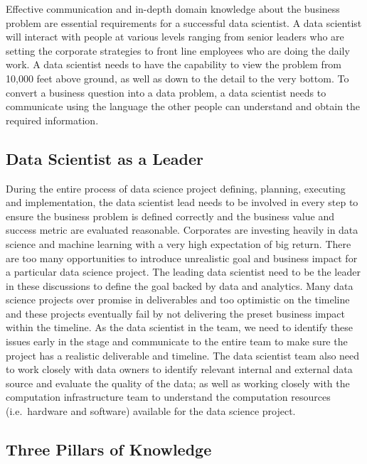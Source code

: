 \documentclass[
]{article}
\begin{document}
Effective communication and in-depth domain knowledge about the business
problem are essential requirements for a successful data scientist. A
data scientist will interact with people at various levels ranging from
senior leaders who are setting the corporate strategies to front line
employees who are doing the daily work. A data scientist needs to have
the capability to view the problem from 10,000 feet above ground, as
well as down to the detail to the very bottom. To convert a business
question into a data problem, a data scientist needs to communicate
using the language the other people can understand and obtain the
required information.

\hypertarget{data-scientist-as-a-leader}{%
\subsection{Data Scientist as a
Leader}\label{data-scientist-as-a-leader}}

During the entire process of data science project defining, planning,
executing and implementation, the data scientist lead needs to be
involved in every step to ensure the business problem is defined
correctly and the business value and success metric are evaluated
reasonable. Corporates are investing heavily in data science and machine
learning with a very high expectation of big return. There are too many
opportunities to introduce unrealistic goal and business impact for a
particular data science project. The leading data scientist need to be
the leader in these discussions to define the goal backed by data and
analytics. Many data science projects over promise in deliverables and
too optimistic on the timeline and these projects eventually fail by not
delivering the preset business impact within the timeline. As the data
scientist in the team, we need to identify these issues early in the
stage and communicate to the entire team to make sure the project has a
realistic deliverable and timeline. The data scientist team also need to
work closely with data owners to identify relevant internal and external
data source and evaluate the quality of the data; as well as working
closely with the computation infrastructure team to understand the
computation resources (i.e.~hardware and software) available for the
data science project.

\hypertarget{three-pillars-of-knowledge}{%
\subsection{Three Pillars of
Knowledge}\label{three-pillars-of-knowledge}}
\end{document}
